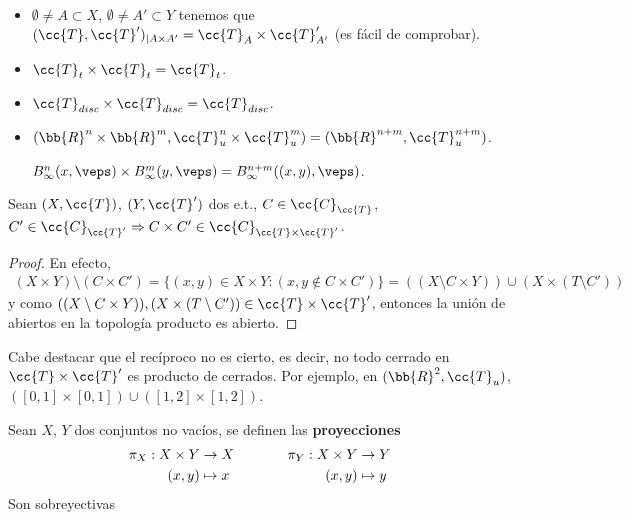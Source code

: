 \begin{ejemplo}\
    \begin{itemize}
        \item $\emptyset\neq A\subset X$, $\emptyset\neq A'\subset Y$ tenemos que $(\cc{T}, \cc{T}')_{|A\times A'}=\cc{T}_A \times \cc{T}_{A'}'$ (es fácil de comprobar).
        \item $\cc{T}_t\times \cc{T}_t = \cc{T}_t$.
        \item $\cc{T}_{disc}\times \cc{T}_{disc}=\cc{T}_{disc}$.
        \item $(\bb{R}^n\times \bb{R}^m, \cc{T}_u^n\times \cc{T}_u^m) = (\bb{R}^{n+m}, \cc{T}_u^{n+m})$.
        
        $B_{\infty}^n(x, \veps)\times B_{\infty}^m(y, \veps) = B_{\infty}^{n+m}((x,y), \veps)$.
    \end{itemize}
    \endsquare
\end{ejemplo}

\begin{observacion}
    Sean $(X, \cc{T})$, $(Y, \cc{T}')$ dos e.t., $C\in \cc{C}_{\cc{T}}$, $C'\in \cc{C}_{\cc{T}'}\Rightarrow C\times C'\in \cc{C}_{\cc{T}\times \cc{T}'}$.

    \begin{proof}
    En efecto, 
    \begin{gather*}
        (X\times Y)\setminus (C\times C')=\{(x,y)\in X\times Y : (x,y\notin C\times C')\} = ((X\setminus C \times Y)) \cup (X\times (T\setminus C'))
    \end{gather*}
    y como $((X\setminus C \times Y)), (X\times (T\setminus C')) \in \cc{T}\times \cc{T}'$, entonces la unión de abiertos en la topología producto es abierto. 
    
    \end{proof}

    Cabe destacar que el recíproco no es cierto, es decir, no todo cerrado en $\cc{T}\times \cc{T}'$ es producto de cerrados. Por ejemplo, en $(\bb{R}^2, \cc{T}_u)$, $([0,1]\times [0,1])\cup ([1,2] \times [1,2])$.

    \endsquare
\end{observacion}

\begin{definicion}
    Sean $X$, $Y$ dos conjuntos no vacíos, se definen las \textbf{proyecciones}
    \begin{align*}
        \pi_X:X\times Y &\to X \hspace*{1cm} &\pi_Y:X\times Y &\to Y\\
        (x,y) &\mapsto x  \hspace{1cm} &(x,y) &\mapsto y
    \end{align*}
    Son sobreyectivas
    \endsquare
\end{definicion}

